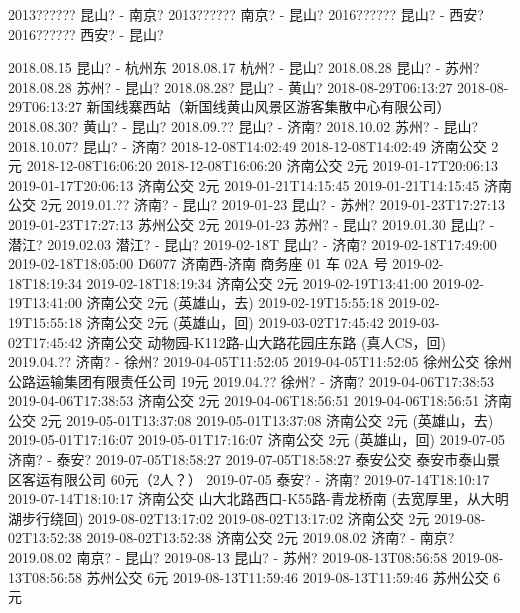 2013??????       昆山? - 南京?
2013??????       南京? - 昆山?
2016??????       昆山? - 西安?
2016??????       西安? - 昆山?


2018.08.15       昆山? - 杭州东
2018.08.17       杭州? - 昆山?
2018.08.28       昆山? - 苏州?
2018.08.28       苏州? - 昆山?
2018.08.28?      昆山? - 黄山?
2018-08-29T06:13:27 2018-08-29T06:13:27 新国线寨西站（新国线黄山风景区游客集散中心有限公司）
2018.08.30?      黄山? - 昆山?
2018.09.??       昆山? - 济南?
2018.10.02       苏州? - 昆山?
2018.10.07?      昆山? - 济南?
2018-12-08T14:02:49 2018-12-08T14:02:49 济南公交 2元
2018-12-08T16:06:20 2018-12-08T16:06:20 济南公交 2元
2019-01-17T20:06:13 2019-01-17T20:06:13 济南公交 2元
2019-01-21T14:15:45 2019-01-21T14:15:45 济南公交 2元
2019.01.??       济南? - 昆山?
2019-01-23       昆山? - 苏州?
2019-01-23T17:27:13 2019-01-23T17:27:13 苏州公交 2元
2019-01-23       苏州? - 昆山?
2019.01.30       昆山? - 潜江?
2019.02.03       潜江? - 昆山?
2019-02-18T      昆山? - 济南?
2019-02-18T17:49:00 2019-02-18T18:05:00 D6077 济南西-济南 商务座 01 车 02A 号
2019-02-18T18:19:34 2019-02-18T18:19:34 济南公交 2元
2019-02-19T13:41:00 2019-02-19T13:41:00 济南公交 2元 (英雄山，去)
2019-02-19T15:55:18 2019-02-19T15:55:18 济南公交 2元 (英雄山，回)
2019-03-02T17:45:42 2019-03-02T17:45:42 济南公交 动物园-K112路-山大路花园庄东路 (真人CS，回)
2019.04.??       济南? - 徐州?
2019-04-05T11:52:05 2019-04-05T11:52:05 徐州公交 徐州公路运输集团有限责任公司 19元
2019.04.??       徐州? - 济南?
2019-04-06T17:38:53 2019-04-06T17:38:53 济南公交 2元
2019-04-06T18:56:51 2019-04-06T18:56:51 济南公交 2元
2019-05-01T13:37:08 2019-05-01T13:37:08 济南公交 2元 (英雄山，去)
2019-05-01T17:16:07 2019-05-01T17:16:07 济南公交 2元 (英雄山，回)
2019-07-05       济南? - 泰安?
2019-07-05T18:58:27 2019-07-05T18:58:27 泰安公交 泰安市泰山景区客运有限公司 60元（2人？）
2019-07-05       泰安? - 济南?
2019-07-14T18:10:17 2019-07-14T18:10:17 济南公交 山大北路西口-K55路-青龙桥南 (去宽厚里，从大明湖步行绕回)
2019-08-02T13:17:02 2019-08-02T13:17:02 济南公交 2元
2019-08-02T13:52:38 2019-08-02T13:52:38 济南公交 2元
2019.08.02       济南? - 南京?
2019.08.02       南京? - 昆山?
2019-08-13       昆山? - 苏州?
2019-08-13T08:56:58 2019-08-13T08:56:58 苏州公交 6元
2019-08-13T11:59:46 2019-08-13T11:59:46 苏州公交 6元
